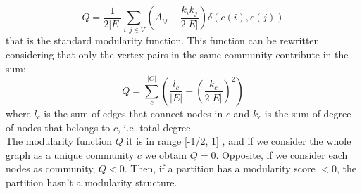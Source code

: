 \begin{equation}\label{ModularityExt}
Q = \frac{1}{2|E|} \sum_{i,j \in V}\left(A_{ij} - \frac{k_ik_j}{2|E|}\right) \delta(c(i), c(j))
\end{equation}
that is the standard modularity function. This function can be rewritten considering that only the vertex pairs in the same community contribute in the sum: 
\begin{equation}\label{ModularityC}
Q =  \sum_{c}^{|C|} \left( \frac{l_c}{|E|} - \left( \frac{k_c}{2|E|}\right) ^2 \right)
\end{equation}
where $l_c$ is the sum of edges that connect nodes in $c$ and $k_c$ is the sum of degree of nodes that belongs to $c$, i.e. total degree. \\
The modularity function $Q$ it is in range [-1/2, 1] \cite{bounds}, and if we consider the whole graph as a unique community $c$ we obtain $Q = 0$. Opposite, if we consider each nodes as community, $Q < 0$. Then, if a partition has a modularity score $<0$, the partition hasn't a modularity structure. 
